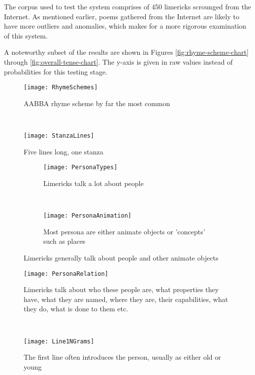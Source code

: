 The corpus used to test the system comprises of 450 limericks scrounged from the Internet. As mentioned earlier, poems gathered from the Internet are likely to have more outliers and anomalies, which makes for a more rigorous examination of this system. 

A noteworthy subset of the results are shown in Figures \ref{fig:rhyme-scheme-chart} through \ref{fig:overall-tense-chart}. The y-axis is given in raw values instead of probabilities for this testing stage.
\newcommand{\exedout}{%
  \rule{0.8\textwidth}{0.5\textwidth}%
}

\begin{figure}[t!]
\centering
\begin{minipage}[t]{.45\textwidth}
	\centering
	\texttt{[image: RhymeSchemes]}
	\caption{AABBA rhyme scheme by far the most common}
	\label{fig:rhyme-scheme-chart}
\end{minipage}
~
\begin{minipage}[t]{.45\textwidth}
	\centering
	\texttt{[image: StanzaLines]}
	\caption{Five lines long, one stanza}
	\label{fig:stanza-lines-chart}
\end{minipage}
\end{figure}

\begin{figure*}[t!]
    \centering
    \begin{subfigure}[t]{0.45\textwidth}
        \centering
        \texttt{[image: PersonaTypes]}
        \caption{Limericks talk a lot about people}
    \end{subfigure}%
    ~ 
    \begin{subfigure}[t]{0.45\textwidth}
        \centering
        \texttt{[image: PersonaAnimation]}
        \caption{Most persona are either animate objects or 'concepts' such as places}
    \end{subfigure}
    \caption{Limericks generally talk about people and other animate objects}
    \label{fig:persona-chart}
\end{figure*}

\begin{figure}[t!]
\centering
\begin{minipage}[t]{.45\textwidth}
	\centering
	\texttt{[image: PersonaRelation]}
	\caption{Limericks talk about who these people are, what properties they have, what they are named, where they are, their capabilities, what they do, what is done to them etc.}
	\label{fig:persona-relation-chart}
\end{minipage}
~
\begin{minipage}[t]{.45\textwidth}
	\centering
	\texttt{[image: Line1NGrams]}
	\caption{The first line often introduces the person, usually as either old or young}
	\label{fig:n-grams-1-chart}
\end{minipage}
\end{figure}


